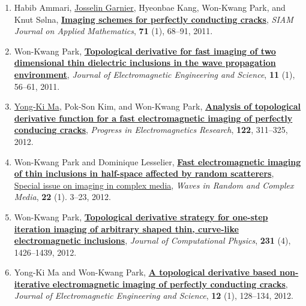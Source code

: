 \documentclass[10pt,A4]{article}
\begin{document}
\begin{enumerate}
\item\label{A-SIAP2011} Habib Ammari, \href{http://www.lpma-paris.fr/pageperso/garnier/}{Josselin Garnier}, Hyeonbae Kang, Won-Kwang Park, and Knut S\o lna, \href{http://dx.doi.org/10.1137/100800130}{\textbf{Imaging schemes for perfectly conducting cracks}}, \textit{SIAM Journal on Applied Mathematics}, \textbf{71} (1), 68--91, 2011.
\item\label{A-JEES2011} Won-Kwang Park, \href{http://dx.doi.org/10.5515/JKIEES.2011.11.1.056}{\textbf{Topological derivative for fast imaging of two dimensional thin dielectric inclusions in the wave propagation environment}}, \textit{Journal of Electromagnetic Engineering and Science}, \textbf{11} (1), 56--61, 2011.
\item\label{A-PIER2012} \href{https://apmath08.cafe24.com/pro06}{Yong-Ki Ma}, Pok-Son Kim, and Won-Kwang Park, \href{http://dx.doi.org/10.2528/PIER11092901}{\textbf{Analysis of topological derivative function for a fast electromagnetic imaging of perfectly conducing cracks}}, \textit{Progress in Electromagnetics Research}, \textbf{122}, 311--325, 2012.
\item\label{A-WRCM2012} Won-Kwang Park and Dominique Lesselier, \href{http://dx.doi.org/10.1080/17455030.2010.536854}{\textbf{Fast electromagnetic imaging of thin inclusions in half-space affected by random scatterers}}, \href{https://doi.org/10.1080/17455030.2012.645138}{Special issue on imaging in complex media}, \textit{Waves in Random and Complex Media}, \textbf{22} (1). 3--23, 2012.
\item\label{A-JCOMP2012} Won-Kwang Park, \href{http://dx.doi.org/10.1016/j.jcp.2011.10.014}{\textbf{Topological derivative strategy for one-step iteration imaging of arbitrary shaped thin, curve-like electromagnetic inclusions}}, \textit{Journal of Computational Physics}, \textbf{231} (4), 1426--1439, 2012.
\item\label{A-JEES2012} Yong-Ki Ma and Won-Kwang Park, \href{http://dx.doi.org/10.5515/JKIEES.2012.12.1.128}{\textbf{A topological derivative based non-iterative electromagnetic imaging of perfectly conducting cracks}}, \textit{Journal of Electromagnetic Engineering and Science},  \textbf{12} (1), 128--134, 2012.

\end{enumerate}
\end{document}
